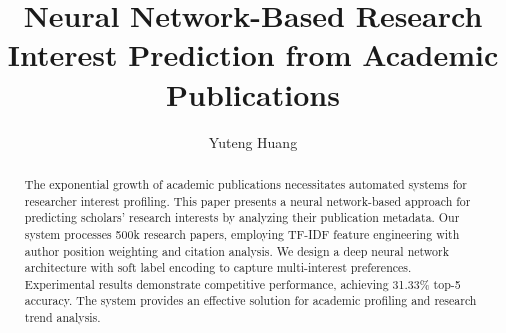 \documentclass[preprint,12pt]{elsarticle}
\begin{document}
\begin{frontmatter}



\title{Neural Network-Based Research Interest Prediction from Academic Publications}


\author{Yuteng Huang} %

\affiliation{}


\begin{abstract}
The exponential growth of academic publications necessitates automated systems for researcher interest profiling.
This paper presents a neural network-based approach for predicting scholars' research interests by analyzing their publication metadata.
Our system processes 500k research papers, employing TF-IDF feature engineering with author position weighting and citation analysis.
We design a deep neural network architecture with soft label encoding to capture multi-interest preferences.
Experimental results demonstrate competitive performance, achieving 31.33\% top-5 accuracy.
The system provides an effective solution for academic profiling and research trend analysis.
\end{abstract}


\end{frontmatter}
\end{document}
